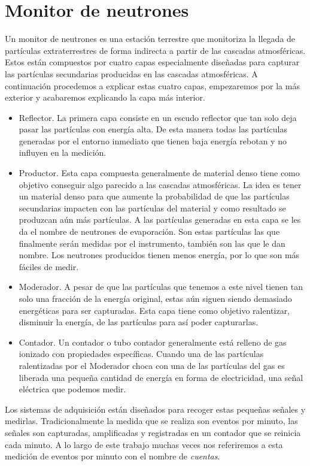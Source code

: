 \section{Monitor de neutrones}
	Un monitor de neutrones es una estación terrestre que monitoriza la llegada de partículas extraterrestres de forma indirecta a partir de las
	cascadas atmosféricas. Estos están compuestos por cuatro capas especialmente diseñadas para capturar las partículas secundarias producidas en
	las cascadas atmosféricas. A continuación procedemos a explicar estas cuatro capas, empezaremos por la más exterior y acabaremos explicando la
	capa más interior.
	\begin{itemize}
		\item	Reflector. La primera capa consiste en un escudo reflector que tan solo deja pasar las partículas con energía alta. De esta
			manera todas las partículas generadas por el entorno inmediato que tienen baja energía rebotan y no influyen en la medición.
		\item	Productor. Esta capa compuesta generalmente de material denso tiene como objetivo conseguir algo parecido a las cascadas
			atmosféricas. La idea es tener un material denso para que aumente la probabilidad de que las partículas secundarias impacten
			con las partículas del material y como resultado se produzcan aún más partículas. A las partículas generadas en esta capa se
			les da el nombre de neutrones de evaporación. Son estas partículas las que finalmente serán medidas por el instrumento,
			también son las que le dan nombre. Los neutrones producidos tienen menos energía, por lo que son más fáciles de medir.
		\item	Moderador. A pesar de que las partículas que tenemos a este nivel tienen tan solo una fracción de la energía original, estas
			aún siguen siendo demasiado energéticas para ser capturadas. Esta capa tiene como objetivo ralentizar, disminuir la energía,
			de las partículas para así poder capturarlas.
		\item	Contador. Un contador o tubo contador generalmente está relleno de gas ionizado con propiedades específicas. Cuando una de
			las partículas ralentizadas por el Moderador choca con una de las partículas del gas es liberada una pequeña cantidad de
			energía en forma de electricidad, una señal eléctrica que podemos medir. 
	\end{itemize}
	\par
	Los sistemas de adquisición están diseñados para recoger estas pequeñas señales y medirlas. Tradicionalmente la medida que se realiza son
	eventos por minuto, las señales son capturadas, amplificadas y registradas en un contador que se reinicia cada minuto. A lo largo de este
	trabajo muchas veces nos referiremos a esta medición de eventos por minuto con el nombre de \emph{cuentas}. 

